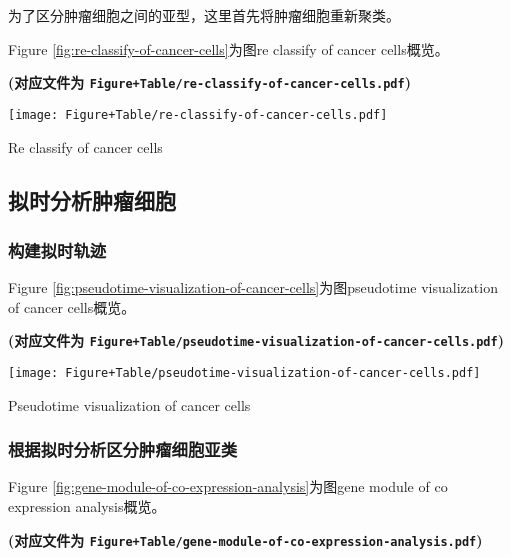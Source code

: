 \documentclass[
]{article}
\begin{document}
为了区分肿瘤细胞之间的亚型，这里首先将肿瘤细胞重新聚类。

Figure \ref{fig:re-classify-of-cancer-cells}为图re classify of cancer cells概览。

\textbf{(对应文件为 \texttt{Figure+Table/re-classify-of-cancer-cells.pdf})}

\def\@captype{figure}
\begin{center}
\texttt{[image: Figure+Table/re-classify-of-cancer-cells.pdf]}
\caption{Re classify of cancer cells}\label{fig:re-classify-of-cancer-cells}
\end{center}

\hypertarget{ux62dfux65f6ux5206ux6790ux80bfux7624ux7ec6ux80de}{%
\subsection{拟时分析肿瘤细胞}\label{ux62dfux65f6ux5206ux6790ux80bfux7624ux7ec6ux80de}}

\hypertarget{ux6784ux5efaux62dfux65f6ux8f68ux8ff9}{%
\subsubsection{构建拟时轨迹}\label{ux6784ux5efaux62dfux65f6ux8f68ux8ff9}}

Figure \ref{fig:pseudotime-visualization-of-cancer-cells}为图pseudotime visualization of cancer cells概览。

\textbf{(对应文件为 \texttt{Figure+Table/pseudotime-visualization-of-cancer-cells.pdf})}

\def\@captype{figure}
\begin{center}
\texttt{[image: Figure+Table/pseudotime-visualization-of-cancer-cells.pdf]}
\caption{Pseudotime visualization of cancer cells}\label{fig:pseudotime-visualization-of-cancer-cells}
\end{center}

\hypertarget{ux6839ux636eux62dfux65f6ux5206ux6790ux533aux5206ux80bfux7624ux7ec6ux80deux4e9aux7c7b}{%
\subsubsection{根据拟时分析区分肿瘤细胞亚类}\label{ux6839ux636eux62dfux65f6ux5206ux6790ux533aux5206ux80bfux7624ux7ec6ux80deux4e9aux7c7b}}

Figure \ref{fig:gene-module-of-co-expression-analysis}为图gene module of co expression analysis概览。

\textbf{(对应文件为 \texttt{Figure+Table/gene-module-of-co-expression-analysis.pdf})}
\end{document}
